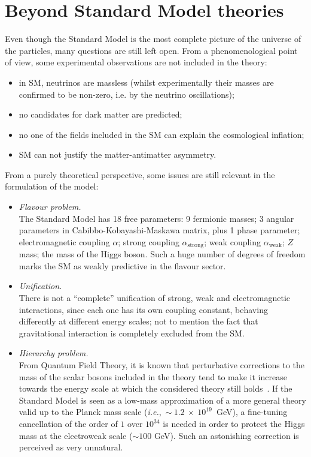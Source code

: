\section{Beyond Standard Model theories}
Even though the Standard Model is the most complete picture of the universe of the particles, many questions are still left open. From a phenomenological point of view, some experimental observations are not included in the theory:
\begin{itemize}
\item in SM, neutrinos are massless (whilst experimentally their masses are confirmed to be non-zero, i.e. by the neutrino oscillations);
\item no candidates for dark matter are predicted;
\item no one of the fields included in the SM can explain the cosmological inflation;
\item SM can not justify the matter-antimatter asymmetry.
\end{itemize}
From a purely theoretical perspective, some issues are still relevant in the formulation of the model:
\begin{itemize}
\item {\itshape Flavour problem.}\\ The Standard Model has 18 free parameters: 9 fermionic masses; 3 angular parameters in Cabibbo-Kobayashi-Maskawa matrix, plus 1 phase parameter; electromagnetic coupling $\alpha$; strong coupling $\alpha_{\text{strong}}$;  weak coupling $\alpha_{\text{weak}}$; $Z$ mass; the mass of the Higgs boson. Such a huge number of degrees of freedom marks the SM as weakly predictive in the flavour sector.
\item {\itshape Unification.}\\ There is not a ``complete'' unification of strong, weak and electromagnetic interactions, since each one has its own coupling constant, behaving differently at different energy scales; not to mention the fact that gravitational interaction is completely excluded from the SM.
\item {\itshape Hierarchy problem.}\\ From Quantum Field Theory, it is known that perturbative corrections to the mass of the scalar bosons included in the theory tend to make it increase towards the energy scale at which the considered theory still holds~\cite{Degrassi:2012ry}. If the Standard Model is seen as a low-mass approximation of a more general theory valid up to the Planck mass scale (\textit{i.e.},~$\sim~1.2~\times~10^{19}$~GeV), a fine-tuning cancellation of the order of $1$ over $10^{34}$ is needed in order to protect the Higgs mass at the electroweak scale ($\sim 100$ GeV). Such an astonishing correction is perceived as very unnatural.
\end{itemize}

